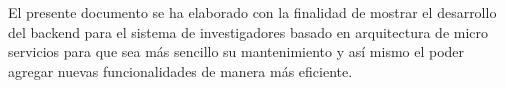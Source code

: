 
El presente documento se ha elaborado con la finalidad de mostrar el desarrollo del backend para el sistema de investigadores basado en arquitectura de micro servicios para que sea más sencillo su mantenimiento y así mismo el poder agregar nuevas funcionalidades de manera más eficiente.
